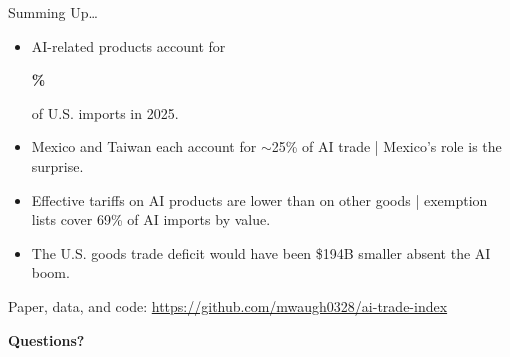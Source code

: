 \documentclass[10pt,pdftex,aspectratio=169]{beamer}
\theoremstyle{definition}
\def\cfNetAiEffect{194}
\begin{document}

\begin{frame}[t]{Summing Up\ldots}
\smallskip
\begin{itemize}
\item AI-related products account for \begin{alert}{\textbf{\aiShareTwentyFive{}\%}}\end{alert} of U.S. imports in 2025.
\bigskip
\item Mexico and Taiwan each account for $\sim$25\% of AI trade | Mexico's role is the surprise.
\bigskip
\item Effective tariffs on AI products are lower than on other goods | exemption lists cover 69\% of AI imports by value.
\bigskip
\item The U.S. goods trade deficit would have been \$\cfNetAiEffect{}B smaller absent the AI boom.
\end{itemize}
\bigskip
\bigskip
Paper, data, and code: \url{https://github.com/mwaugh0328/ai-trade-index}
\end{frame}


\begin{frame}[t]
\large
\bigskip
\bigskip
\bigskip
{\LARGE \centerline{\textbf{Questions?}}}
\end{frame}

\end{document}
